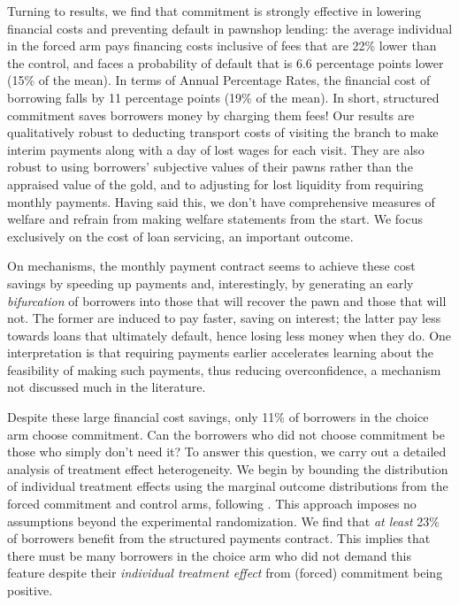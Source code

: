 \documentclass[12pt, a4paper]{article}
\begin{document}
Turning to results, we find that commitment is strongly effective in lowering financial costs and preventing default in pawnshop lending: the average individual in the forced arm pays financing costs inclusive of fees that are 22\% lower than the control, and faces a probability of default that is 6.6 percentage points lower (15\% of the mean). In terms of Annual Percentage Rates, the financial cost of borrowing falls by 11 percentage points (19\% of the mean). In short, structured commitment saves borrowers money by charging them fees! Our results are qualitatively robust to deducting transport costs of visiting the branch to make interim payments along with a day of lost wages for each visit. They are also robust to using borrowers' subjective values of their pawns rather than the appraised value of the gold, and to adjusting for lost liquidity from requiring monthly payments. Having said this, we don't have comprehensive measures of welfare and refrain from making welfare statements from the start. We focus exclusively on the cost of loan servicing, an important outcome.

On mechanisms, the monthly payment contract seems to achieve these cost savings by speeding up payments and, interestingly, by generating an early \textit{bifurcation} of borrowers into those that will recover the pawn and those that will not. The former are induced to pay faster, saving on interest; the latter pay less towards loans that ultimately default, hence losing less money when they do. One interpretation is that requiring payments earlier accelerates learning about the feasibility of making such payments, thus reducing overconfidence, a mechanism not discussed much in the literature. 

Despite these large financial cost savings, only 11\% of borrowers in the choice arm choose commitment. 
Can the borrowers who did not choose commitment be those who simply don't need it? 
To answer this question, we carry out a detailed analysis of treatment effect heterogeneity.
We begin by bounding the distribution of individual treatment effects using the marginal outcome distributions from the forced commitment and control arms, following \cite{fan2010sharp}. This approach imposes no assumptions beyond the experimental randomization. We find that \textit{at least} 23\% of borrowers benefit from the structured payments contract. This implies that there must be many borrowers in the choice arm who did not demand this feature despite their \emph{individual treatment effect} from (forced) commitment being positive. 
\end{document}
